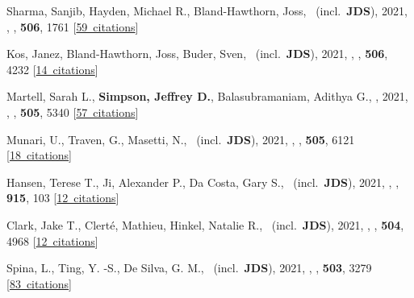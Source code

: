 \item[{\color{numcolor}\scriptsize60}] Sharma, Sanjib, Hayden, Michael R., Bland-Hawthorn, Joss, \etal\ (incl.\ \textbf{JDS}), 2021, , \mnras, \textbf{506}, 1761 [\href{https://ui.adsabs.harvard.edu/#abs/2021MNRAS.506.1761S}{59~citations}]

\item[{\color{numcolor}\scriptsize59}] Kos, Janez, Bland-Hawthorn, Joss, Buder, Sven, \etal\ (incl.\ \textbf{JDS}), 2021, , \mnras, \textbf{506}, 4232 [\href{https://ui.adsabs.harvard.edu/#abs/2021MNRAS.506.4232K}{14~citations}]

\item[{\color{numcolor}\scriptsize58}] Martell, Sarah L., \textbf{Simpson, Jeffrey D.}, Balasubramaniam, Adithya G., \etal, 2021, , \mnras, \textbf{505}, 5340 [\href{https://ui.adsabs.harvard.edu/#abs/2021MNRAS.505.5340M}{57~citations}]

\item[{\color{numcolor}\scriptsize57}] Munari, U., Traven, G., Masetti, N., \etal\ (incl.\ \textbf{JDS}), 2021, , \mnras, \textbf{505}, 6121 [\href{https://ui.adsabs.harvard.edu/#abs/2021MNRAS.505.6121M}{18~citations}]

\item[{\color{numcolor}\scriptsize56}] Hansen, Terese T., Ji, Alexander P., Da Costa, Gary S., \etal\ (incl.\ \textbf{JDS}), 2021, , \apj, \textbf{915}, 103 [\href{https://ui.adsabs.harvard.edu/#abs/2021ApJ...915..103H}{12~citations}]

\item[{\color{numcolor}\scriptsize55}] Clark, Jake T., Clert{\'e}, Mathieu, Hinkel, Natalie R., \etal\ (incl.\ \textbf{JDS}), 2021, , \mnras, \textbf{504}, 4968 [\href{https://ui.adsabs.harvard.edu/#abs/2021MNRAS.504.4968C}{12~citations}]

\item[{\color{numcolor}\scriptsize54}] Spina, L., Ting, Y. -S., De Silva, G. M., \etal\ (incl.\ \textbf{JDS}), 2021, , \mnras, \textbf{503}, 3279 [\href{https://ui.adsabs.harvard.edu/#abs/2021MNRAS.503.3279S}{83~citations}]

